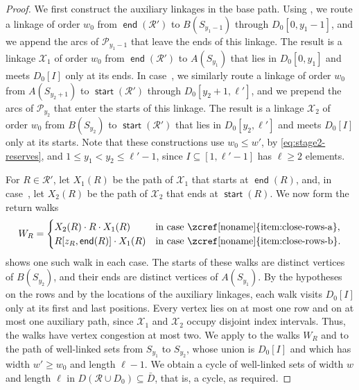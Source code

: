\documentclass[fontsize=12pt,leading=14pt]{fullpaper}
\DeclareMathOperator{\st}{\mathsf{start}}
\DeclareMathOperator{\en}{\mathsf{end}}
\newcommand{\Pcal}{\mathcal{P}}
\newcommand{\Rcal}{\mathcal{R}}
\newcommand{\Xcal}{\mathcal{X}}
\begin{document}
\begin{proof}
  We first construct the auxiliary linkages in the base path.
  Using , we route a linkage of order $w_0$ from $\en(\Rcal')$ to $B(S_{y_1-1})$ through $D_0[0,y_1-1]$, and we append the arcs of $\Pcal_{y_1-1}$ that leave the ends of this linkage.
  The result is a linkage $\Xcal_1$ of order $w_0$ from $\en(\Rcal')$ to $A(S_{y_1})$ that lies in $D_0[0,y_1]$ and meets $D_0[I]$ only at its ends.
  In case~, we similarly route a linkage of order $w_0$ from $A(S_{y_2+1})$ to $\st(\Rcal')$ through $D_0[y_2+1,\ell']$, and we prepend the arcs of $\Pcal_{y_2}$ that enter the starts of this linkage.
  The result is a linkage $\Xcal_2$ of order $w_0$ from $B(S_{y_2})$ to $\st(\Rcal')$ that lies in $D_0[y_2,\ell']$ and meets $D_0[I]$ only at its starts.
  Note that these constructions use $w_0\le w'$, by \eqref{eq:stage2-reserves}, and $1\le y_1<y_2\le\ell'-1$, since $I\subseteq[1,\ell'-1]$ has $\ell\ge2$ elements.

  For $R\in\Rcal'$, let $X_1(R)$ be the path of $\Xcal_1$ that starts at $\en(R)$, and, in case~, let $X_2(R)$ be the path of $\Xcal_2$ that ends at $\st(R)$.
  We now form the return walks
  \[
    W_R=
    \begin{cases}
      X_2(R)\cdot R\cdot X_1(R)&\text{in case~\zcref[noname]{item:close-rows-a}},\\
      R[z_R,\en(R)]\cdot X_1(R)&\text{in case~\zcref[noname]{item:close-rows-b}}.
    \end{cases}
  \]
   shows one such walk in each case.
  The starts of these walks are distinct vertices of $B(S_{y_2})$, and their ends are distinct vertices of $A(S_{y_1})$.
  By the hypotheses on the rows and by the locations of the auxiliary linkages, each walk visits $D_0[I]$ only at its first and last positions.
  Every vertex lies on at most one row and on at most one auxiliary path, since $\Xcal_1$ and $\Xcal_2$ occupy disjoint index intervals.
  Thus, the walks have vertex congestion at most two.
  We apply  to the walks $W_R$ and to the path of well-linked sets from $S_{y_1}$ to $S_{y_2}$, whose union is $D_0[I]$ and which has width $w'\ge w_0$ and length $\ell-1$.
  We obtain a cycle of well-linked sets of width $w$ and length $\ell$ in $D(\Rcal\cup D_0)\subseteq\bar D$, that is, a cycle, as required.
\end{proof}
\end{document}
